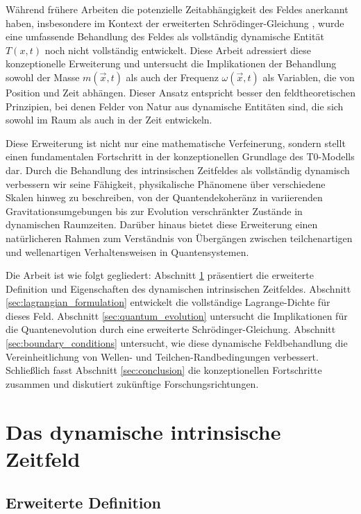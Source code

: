\documentclass[12pt,a4paper]{article}
\newcommand{\Tfieldt}{T(x,t)}
\newcommand{\vecx}{\vec{x}}
\begin{document}
	Während frühere Arbeiten die potenzielle Zeitabhängigkeit des Feldes anerkannt haben, insbesondere im Kontext der erweiterten Schrödinger-Gleichung \cite{pascher_quantum_2025}, wurde eine umfassende Behandlung des Feldes als vollständig dynamische Entität $\Tfieldt$ noch nicht vollständig entwickelt. Diese Arbeit adressiert diese konzeptionelle Erweiterung und untersucht die Implikationen der Behandlung sowohl der Masse $m(\vecx,t)$ als auch der Frequenz $\omega(\vecx,t)$ als Variablen, die von Position und Zeit abhängen. Dieser Ansatz entspricht besser den feldtheoretischen Prinzipien, bei denen Felder von Natur aus dynamische Entitäten sind, die sich sowohl im Raum als auch in der Zeit entwickeln.
	
	Diese Erweiterung ist nicht nur eine mathematische Verfeinerung, sondern stellt einen fundamentalen Fortschritt in der konzeptionellen Grundlage des T0-Modells dar. Durch die Behandlung des intrinsischen Zeitfeldes als vollständig dynamisch verbessern wir seine Fähigkeit, physikalische Phänomene über verschiedene Skalen hinweg zu beschreiben, von der Quantendekoheränz in variierenden Gravitationsumgebungen bis zur Evolution verschränkter Zustände in dynamischen Raumzeiten. Darüber hinaus bietet diese Erweiterung einen natürlicheren Rahmen zum Verständnis von Übergängen zwischen teilchenartigen und wellenartigen Verhaltensweisen in Quantensystemen.
	
	Die Arbeit ist wie folgt gegliedert: Abschnitt \ref{sec:dynamic_time_field} präsentiert die erweiterte Definition und Eigenschaften des dynamischen intrinsischen Zeitfeldes. Abschnitt \ref{sec:lagrangian_formulation} entwickelt die vollständige Lagrange-Dichte für dieses Feld. Abschnitt \ref{sec:quantum_evolution} untersucht die Implikationen für die Quantenevolution durch eine erweiterte Schrödinger-Gleichung. Abschnitt \ref{sec:boundary_conditions} untersucht, wie diese dynamische Feldbehandlung die Vereinheitlichung von Wellen- und Teilchen-Randbedingungen verbessert. Schließlich fasst Abschnitt \ref{sec:conclusion} die konzeptionellen Fortschritte zusammen und diskutiert zukünftige Forschungsrichtungen.
	
	\section{Das dynamische intrinsische Zeitfeld}
	\label{sec:dynamic_time_field}
	
	\subsection{Erweiterte Definition}
	\label{subsec:extended_definition}
	
\end{document}
